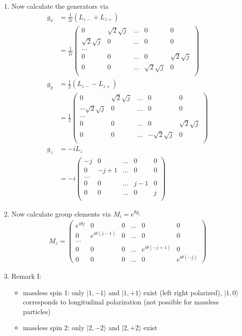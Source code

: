 \documentclass[../main.tex]{subfiles}
\begin{document}
\begin{enumerate}
\item Now calculate the generators via
\begin{align}
g_x&=\frac{1}{2i}(L_{z-}+L_{z+})\\
&=\frac{1}{2i}\left(\begin{matrix}
0 & \sqrt{2}\sqrt{j} & ... & 0 & 0\\
 \sqrt{2}\sqrt{j} & 0 &  ... & 0 & 0\\
 ...\\
  0 & 0 & ... & 0&\sqrt{2}\sqrt{j}\\
 0 & 0 & ... &  \sqrt{2}\sqrt{j} &0\\
\end{matrix}\right)
\\
g_y&=\frac{1}{2}(L_{z-}-L_{z+})\\
&=\frac{1}{2}\left(\begin{matrix}
0 & \sqrt{2}\sqrt{j} & ... & 0 & 0\\
-\sqrt{2}\sqrt{j} & 0 &  ... & 0 & 0\\
 ...\\
  0 & 0 & ... & 0&\sqrt{2}\sqrt{j}\\
 0 & 0 & ... &  -\sqrt{2}\sqrt{j} &0\\
\end{matrix}\right)
\\
g_z&=-iL_z\\
&=-i\left(\begin{matrix}
-j & 0 & ... & 0 & 0\\
0 & -j+1 &  ... & 0 & 0\\
 ...\\
  0 & 0 & ... & j-1 &0\\
 0 & 0 & ... & 0 &j\\
\end{matrix}\right)
\end{align}

\item Now calculate group elements via $M_i=e^{\theta g_i}$
\begin{align}
M_z=\left(\begin{matrix}
e^{i\theta j} & 0 & 0 & ...  & 0 & 0\\
0 & e^{i\theta (j-1)} & 0 & ... & 0 & 0 \\
... &\\
0 & 0 & 0 & ...  & e^{i\theta (-j+1)} & 0 \\ 
0 & 0 & 0 & ...  & 0 & e^{i\theta(-j)} 
\end{matrix}\right)
\end{align}
\item Remark I:
\begin{itemize}
\item massless spin 1: only $|1,-1\rangle$ and $|1,+1\rangle$ exist (left right polarized), $|1,0\rangle$ corresponds to longitudinal polarization (not possible for massless particles)
\item massless spin 2: only $|2,-2\rangle$ and $|2,+2\rangle$ exist
\end{itemize}


\end{enumerate}
\end{document}
